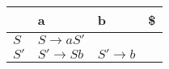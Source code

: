 \documentclass{standalone}
\providecommand\lightrule{%
	\arrayrulecolor{black!30}%
	\midrule[\lightrulewidth]%
	\arrayrulecolor{black}}
\begin{document}
\begin{tabularx}{\textwidth}{XXXX}
     & a & b & \$ \\
    \midrule
        \(S\)
        &
        \(S \rightarrow aS'\)
        &
        
        &
        \\ \lightrule
        \(S'\)
        &
        \(S' \rightarrow Sb\)
        &
        \(S' \rightarrow b\)
        &
\end{tabularx}
\end{document}
